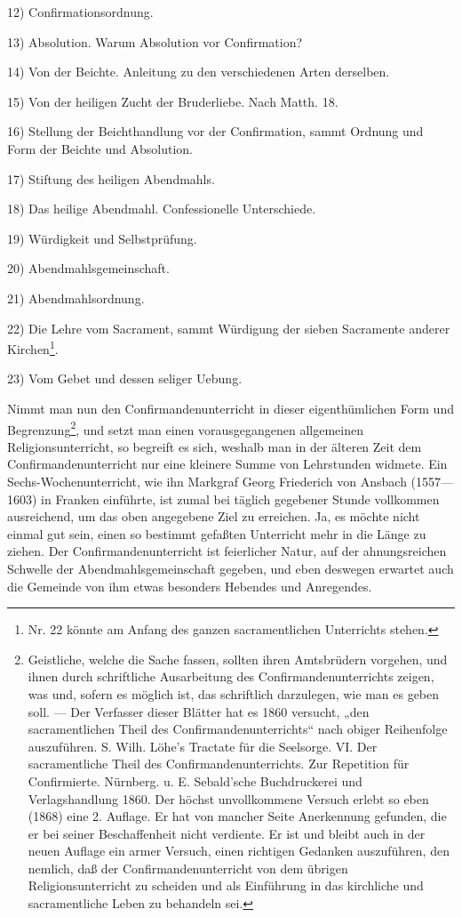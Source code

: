 12) Confirmationsordnung.

13) Absolution. Warum Absolution vor Confirmation?

14) Von der Beichte. Anleitung zu den verschiedenen Arten derselben.

15) Von der heiligen Zucht der Bruderliebe. Nach Matth. 18.

16) Stellung der Beichthandlung vor der Confirmation, sammt Ordnung und Form der Beichte und Absolution.

17) Stiftung des heiligen Abendmahls.

18) Das heilige Abendmahl. Confessionelle Unterschiede.

19) Würdigkeit und Selbstprüfung.

20) Abendmahlsgemeinschaft.

21) Abendmahlsordnung.

22) Die Lehre vom Sacrament, sammt Würdigung der sieben Sacramente anderer Kirchen\footnote{Nr. 22 könnte am Anfang des ganzen sacramentlichen Unterrichts stehen.}.

23) Vom Gebet und dessen seliger Uebung.

Nimmt man nun den Confirmandenunterricht in dieser eigenthümlichen Form und Begrenzung\footnote{Geistliche, welche die Sache fassen, sollten ihren Amtsbrüdern vorgehen, und ihnen durch schriftliche Ausarbeitung des Confirmandenunterrichts zeigen, was und, sofern es möglich ist, das schriftlich darzulegen, wie man es geben soll. — Der Verfasser dieser Blätter hat es 1860 versucht, „den sacramentlichen Theil des Confirmandenunterrichts“ nach obiger Reihenfolge auszuführen. S. Wilh. Löhe’s Tractate für die Seelsorge. VI. Der sacramentliche Theil des Confirmandenunterrichts. Zur Repetition für Confirmierte. Nürnberg. u. E. Sebald’sche Buchdruckerei und Verlagshandlung 1860. Der höchst unvollkommene Versuch erlebt so eben (1868) eine 2. Auflage. Er hat von mancher Seite Anerkennung gefunden, die er bei seiner Beschaffenheit nicht verdiente. Er ist und bleibt auch in der neuen Auflage ein armer Versuch, einen richtigen Gedanken auszuführen, den nemlich, daß der Confirmandenunterricht von dem übrigen Religionsunterricht zu scheiden und als Einführung in das kirchliche und sacramentliche Leben zu behandeln sei.}, und setzt man einen vorausgegangenen allgemeinen Religionsunterricht, so begreift es sich, weshalb man in der älteren Zeit dem Confirmandenunterricht nur eine kleinere Summe von Lehrstunden widmete. Ein Sechs-Wochenunterricht, wie ihn Markgraf Georg Friederich von Ansbach (1557—1603) in Franken einführte, ist zumal bei täglich gegebener Stunde vollkommen ausreichend, um das oben angegebene Ziel zu erreichen. Ja, es möchte nicht einmal gut sein, einen so bestimmt gefaßten Unterricht mehr in die Länge zu ziehen. Der Confirmandenunterricht ist feierlicher Natur, auf der ahnungsreichen Schwelle der Abendmahlsgemeinschaft gegeben, und eben deswegen erwartet auch die Gemeinde von ihm etwas besonders Hebendes und Anregendes.

